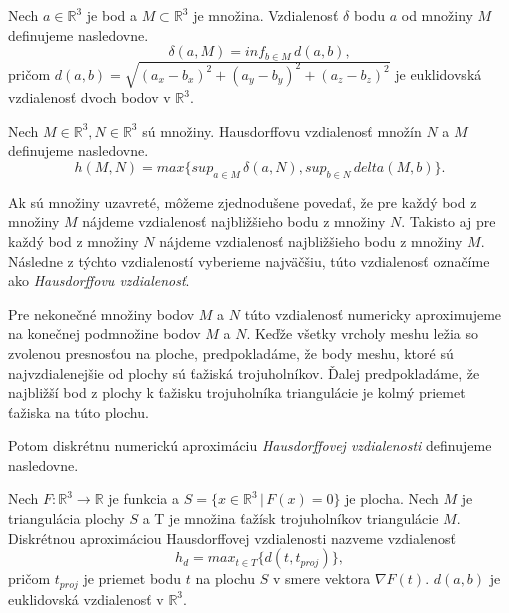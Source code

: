 \begin{enumerate}
{    \begin{definition}
        Nech $a \in \mathbb{R}^3$ je bod a $M \subset \mathbb{R}^3$ je množina.
        Vzdialenosť $\delta$ bodu $a$ od množiny $M$ definujeme nasledovne.
        \begin{equation}
            \delta(a, M) = inf_{b \in M} \, d(a, b),
        \end{equation}
        pričom $d(a, b) = \sqrt{(a_x-b_x)^2 + (a_y-b_y)^2 + (a_z-b_z)^2}$ je euklidovská 
        vzdialenosť dvoch bodov v $\mathbb{R}^3$.
    \end{definition}

    \begin{definition}
        Nech $M \in \mathbb{R}^3, N \in \mathbb{R}^3$ sú množiny.
        Hausdorffovu vzdialenosť množín $N$ a $M$ definujeme nasledovne.
        \begin{equation}
            h(M, N) = max \big \{sup_{a \in M} \, \delta(a, N), sup_{b \in N} \, delta(M, b) \big \}.
        \end{equation}
    \end{definition}

    Ak sú množiny uzavreté, môžeme zjednodušene povedať, že pre každý bod z množiny $M$ nájdeme 
    vzdialenosť najbližšieho bodu z množiny $N$.
    Takisto aj pre každý bod z množiny $N$ nájdeme vzdialenosť najbližšieho bodu z množiny $M$.
    Následne z týchto vzdialeností vyberieme najväčšiu, túto vzdialenosť označíme ako 
    \textit{Hausdorffovu vzdialenosť}.

    Pre nekonečné množiny bodov $M$ a $N$ túto vzdialenosť numericky aproximujeme na konečnej 
    podmnožine bodov $M$ a $N$. Keďže všetky vrcholy meshu ležia so zvolenou presnosťou na ploche, 
    predpokladáme, že body meshu, ktoré sú najvzdialenejšie od plochy sú ťažiská trojuholníkov.
    Ďalej predpokladáme, že najbližší bod z plochy k ťažisku trojuholníka triangulácie
    je kolmý priemet ťažiska na túto plochu.

    Potom diskrétnu numerickú aproximáciu \textit{Hausdorffovej vzdialenosti} definujeme nasledovne.
    \begin{definition}
        Nech $F:\mathbb{R}^3 \to \mathbb{R}$ je funkcia a $S = \{x \in \mathbb{R}^3 \, | \, F(x)=0 \}$ 
        je plocha. Nech $M$ je triangulácia plochy $S$
        a T je množina ťažísk trojuholníkov triangulácie $M$.
        Diskrétnou aproximáciou Hausdorffovej vzdialenosti nazveme vzdialenosť
        \begin{equation}
            h_d = max_{t \in T} \big \{ d(t, t_{proj})\big \},
        \end{equation}
        pričom $t_{proj}$ je priemet bodu $t$ na plochu $S$ v smere vektora $\nabla F(t)$.
        $d(a, b)$ je euklidovská vzdialenosť v $\mathbb{R}^3$.
    \end{definition}

}
\end{enumerate}
